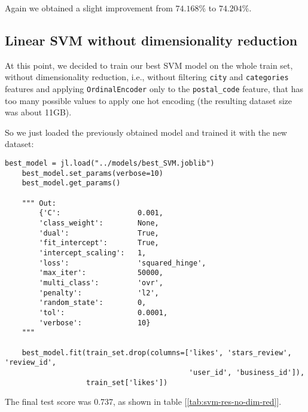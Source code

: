 Again we obtained a slight improvement from $74.168\%$ to $74.204\%$.


\newpage
\subsection{Linear SVM without dimensionality reduction} \label{sec:svm-no-dim-red}

At this point, we decided to train our best SVM model on the whole train set, without dimensionality reduction, i.e., without filtering \texttt{city} and \texttt{categories} features and applying \texttt{OrdinalEncoder} only to the \texttt{postal\_code} feature, that has too many possible values to apply one hot encoding (the resulting dataset size was about 11GB).

So we just loaded the previously obtained model and trained it with the new dataset:

\begin{lstlisting}[caption={SVM without dimensionality reduction},label={lst:svm-no-dim-red}]
    best_model = jl.load("../models/best_SVM.joblib")
    best_model.set_params(verbose=10)
    best_model.get_params()
    
    """ Out:
        {'C':                  0.001,
        'class_weight':        None,
        'dual':                True,
        'fit_intercept':       True,
        'intercept_scaling':   1,
        'loss':                'squared_hinge',
        'max_iter':            50000,
        'multi_class':         'ovr',
        'penalty':             'l2',
        'random_state':        0,
        'tol':                 0.0001,
        'verbose':             10}
    """
    
    best_model.fit(train_set.drop(columns=['likes', 'stars_review', 'review_id',
                                           'user_id', 'business_id']), 
                   train_set['likes'])
\end{lstlisting}

The final test score was 0.737, as shown in table [\ref{tab:svm-res-no-dim-red}].

